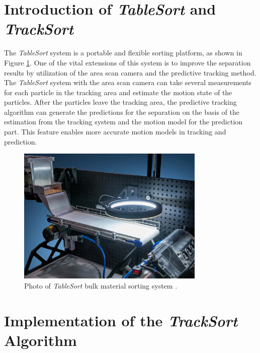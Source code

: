 \section{Introduction of \textit{TableSort} and \textit{TrackSort}}

The \textit{TableSort} system is a portable and flexible sorting platform, as shown in Figure \ref{fig:tablesortsystem}. One of the vital extensions of this system is to improve the separation results by utilization of the area scan camera and the predictive tracking method. The \textit{TableSort} system with the area scan camera can take several measurements for each particle in the tracking area and estimate the motion state of the particles. After the particles leave the tracking area, the predictive tracking algorithm can generate the predictions for the separation on the basis of the estimation from the tracking system and the motion model for the prediction part. This feature enables more accurate motion models in tracking and prediction.

\begin{figure}[htbp]
    \centering
	\includegraphics[width=0.8\textwidth]{figures/AT20-TrackSortMotionModels.jpg}
	\caption{Photo of \textit{TableSort} bulk material sorting system \cite{pfaff2020predictive}.}
	\label{fig:tablesortsystem}
\end{figure}

\section{Implementation of the \textit{TrackSort} Algorithm}

